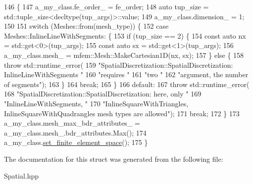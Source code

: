 \begin{DoxyCode}
146                                                                    \{
147     a\_my\_class.fe\_order\_ = fe\_order;
148     \textcolor{keyword}{auto} tup\_size = std::tuple\_size<decltype(tup\_args)>::value;
149     a\_my\_class.dimension\_ = 1;
150 
151     \textcolor{keywordflow}{switch} (Meshes::from(mesh\_type)) \{
152       \textcolor{keywordflow}{case} Meshes::InlineLineWithSegments: \{
153         \textcolor{keywordflow}{if} (tup\_size == 2) \{
154           \textcolor{keyword}{const} \textcolor{keyword}{auto} nx = std::get<0>(tup\_args);
155           \textcolor{keyword}{const} \textcolor{keyword}{auto} sx = std::get<1>(tup\_args);
156           a\_my\_class.mesh\_ = mfem::Mesh::MakeCartesian1D(nx, sx);
157         \} \textcolor{keywordflow}{else} \{
158           \textcolor{keywordflow}{throw} std::runtime\_error(
159               \textcolor{stringliteral}{"SpatialDiscretization::SpatialDiscretization: InlineLineWithSegments "}
160               \textcolor{stringliteral}{"requires "}
161               \textcolor{stringliteral}{"two "}
162               \textcolor{stringliteral}{"argument, the number of segments"});
163         \}
164         \textcolor{keywordflow}{break};
165       \}
166       \textcolor{keywordflow}{default}:
167         \textcolor{keywordflow}{throw} std::runtime\_error(
168             \textcolor{stringliteral}{"SpatialDiscretization::SpatialDiscretization: here, only "}
169             \textcolor{stringliteral}{"InlineLineWithSegments, "}
170             \textcolor{stringliteral}{"InlineSquareWithTriangles, InlineSquareWithQuadrangles mesh types are allowed"});
171         \textcolor{keywordflow}{break};
172     \}
173     a\_my\_class.mesh\_max\_bdr\_attributes\_ = a\_my\_class.mesh\_.bdr\_attributes.Max();
174     a\_my\_class.\hyperlink{classSpatialDiscretization_a8400a265a094312b4d57708d44f9d627}{set\_finite\_element\_space}();
175   \}
\end{DoxyCode}


The documentation for this struct was generated from the following file\+:\begin{DoxyCompactItemize}
\item 
Spatial.\+hpp\end{DoxyCompactItemize}
